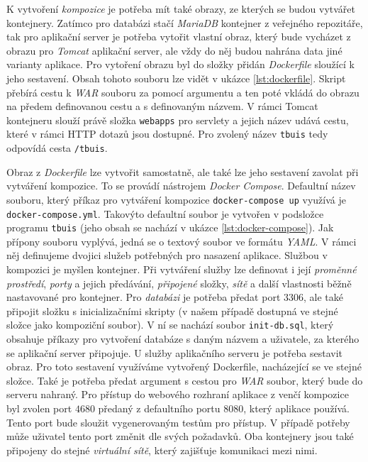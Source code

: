 \documentclass[czech, ma, kiv, he, iso690alph, pdf, viewonly]{fasthesis}
\begin{document}
    K vytvoření \textit{kompozice} je potřeba mít také obrazy, ze kterých se budou vytvářet kontejnery. Zatímco pro databázi stačí \textit{MariaDB} kontejner z veřejného repozitáře, tak pro aplikační server je potřeba vytořit vlastní obraz, který bude vycházet z obrazu pro \textit{Tomcat} aplikační server, ale vždy do něj budou nahrána data jiné varianty aplikace. Pro vytoření obrazu byl do složky přidán \textit{Dockerfile} sloužící k jeho sestavení. Obsah tohoto souboru lze vidět v ukázce \ref{lst:dockerfile}. Skript přebírá cestu k \textit{WAR} souboru za pomocí argumentu a ten poté vkládá do obrazu na předem definovanou cestu a s definovaným názvem. V rámci Tomcat kontejneru slouží právě složka \verb|webapps| pro servlety a jejich název udává cestu, které v rámci HTTP dotazů jsou dostupné. Pro zvolený název \verb|tbuis| tedy odpovídá cesta \verb|/tbuis|.


    Obraz z \textit{Dockerfile} lze vytvořit samostatně, ale také lze jeho sestavení zavolat při vytváření kompozice. To se provádí nástrojem \textit{Docker Compose}. Defaultní název souboru, který příkaz pro vytváření kompozice \verb|docker-compose up| využívá je \verb|docker-compose.yml|. Takovýto defaultní soubor je vytvořen v podsložce programu \verb|tbuis| (jeho obsah se nachází v ukázce \ref{lst:docker-compose}). Jak přípony souboru vyplývá, jedná se o textový soubor ve formátu \textit{YAML}. V rámci něj definujeme dvojici služeb potřebných pro nasazení aplikace. Službou v kompozici je myšlen kontejner. Při vytváření služby lze definovat i její \textit{proměnné prostředí}, \textit{porty} a jejich předávání, \textit{připojené} složky, \textit{sítě} a další vlastnosti běžně nastavované pro kontejner. Pro \textit{databázi} je potřeba předat port \(3306\), ale také připojit složku s inicializačními skripty (v našem případě dostupná ve stejné složce jako kompoziční soubor). V ní se nachází soubor \verb|init-db.sql|, který obsahuje příkazy pro vytvoření databáze s daným názvem a uživatele, za kterého se aplikační server připojuje. U služby aplikačního serveru je potřeba sestavit obraz. Pro toto sestavení využíváme vytvořený Dockerfile, nacházející se ve stejné složce. Také je potřeba předat argument s cestou pro \textit{WAR} soubor, který bude do serveru nahraný. Pro přístup do webového rozhraní aplikace z venčí kompozice byl zvolen port \(4680\) předaný z defaultního portu \(8080\), který aplikace používá. Tento port bude sloužit vygenerovaným testům pro přístup. V případě potřeby může uživatel tento port změnit dle svých požadavků. Oba kontejnery jsou také připojeny do stejné \textit{virtuální sítě}, který zajišťuje komunikaci mezi nimi. 
\end{document}
